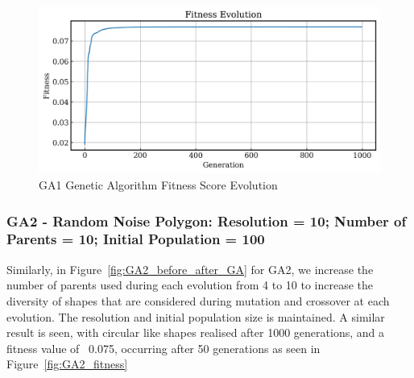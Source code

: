 \documentclass{article}
\begin{document}
\begin{figure}[H]
    \centering
    \includegraphics[width=0.75\linewidth]{figures/GAResults/GA1/1000gens_4pars_100initpop_5pcent_mut.png}
    \caption{GA1 Genetic Algorithm Fitness Score Evolution}
    \label{fig:GA1_fitness_curve}
\end{figure}

\subsubsection*{GA2 - Random Noise Polygon: Resolution = 10; Number of Parents = 10; Initial Population = 100}

Similarly, in Figure~\ref{fig:GA2_before_after_GA} for GA2, we increase the number of parents used during each evolution from 4 to 10 to increase the diversity of shapes that are considered during mutation and crossover at each evolution. The resolution and initial population size is maintained. A similar result is seen, with circular like shapes realised after 1000 generations, and a fitness value of ~0.075, occurring after 50 generations as seen in Figure~\ref{fig:GA2_fitness}
\end{document}
